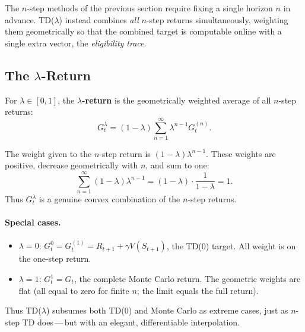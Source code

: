The $n$-step methods of the previous section require fixing a single horizon $n$ in advance.  TD($\lambda$) instead combines \emph{all} $n$-step returns simultaneously, weighting them geometrically so that the combined target is computable online with a single extra vector, the \emph{eligibility trace}.

\subsection{The $\lambda$-Return}

\begin{definition}
\label{def:lambda-return}
For $\lambda\in[0,1]$, the \textbf{$\lambda$-return} is the geometrically weighted average of all $n$-step returns:
\begin{equation}
\label{eq:lambda-return}
G_t^\lambda = (1-\lambda)\sum_{n=1}^{\infty}\lambda^{n-1}G_t^{(n)}.
\end{equation}
\end{definition}

The weight given to the $n$-step return is $(1-\lambda)\lambda^{n-1}$.  These weights are positive, decrease geometrically with $n$, and sum to one:
\[
\sum_{n=1}^{\infty}(1-\lambda)\lambda^{n-1} = (1-\lambda)\cdot\frac{1}{1-\lambda} = 1.
\]
Thus $G_t^\lambda$ is a genuine convex combination of the $n$-step returns.

\paragraph{Special cases.}
\begin{itemize}[leftmargin=*]
  \item $\lambda = 0$: $G_t^0 = G_t^{(1)} = R_{t+1}+\gamma V(S_{t+1})$, the TD(0) target.  All weight is on the one-step return.
  \item $\lambda = 1$: $G_t^1 = G_t$, the complete Monte Carlo return.  The geometric weights are flat (all equal to zero for finite $n$; the limit equals the full return).
\end{itemize}
Thus TD($\lambda$) subsumes both TD(0) and Monte Carlo as extreme cases, just as $n$-step TD does\,---\,but with an elegant, differentiable interpolation.

